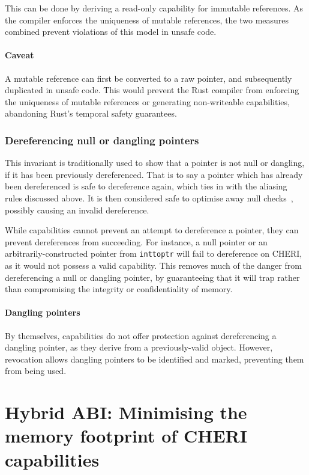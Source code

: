 \documentclass[dissertation.tex]{subfiles}
\begin{document}
This can be done by deriving a read-only capability for immutable
references.
As the compiler enforces the uniqueness of mutable references, the two
measures combined prevent violations of this model in unsafe code.

\paragraph{Caveat}
A mutable reference can first be converted to a raw pointer, and
subsequently duplicated in unsafe code.
This would prevent the Rust compiler from enforcing the uniqueness of
mutable references or generating non-writeable capabilities, abandoning
Rust's temporal safety guarantees.

\subsubsection{Dereferencing null or dangling pointers}
This invariant is traditionally used to show that a pointer is not
null or dangling, if it has been previously dereferenced.
That is to say a pointer which has already been dereferenced is safe to
dereference again, which ties in with the aliasing rules discussed
above.
It is then considered safe to optimise away null
checks~\cite{wang2013towards,llvm-undef-dce}, possibly causing an
invalid dereference.

While capabilities cannot prevent an attempt to dereference a pointer,
they can prevent dereferences from succeeding.
For instance, a null pointer or an arbitrarily-constructed pointer from
\texttt{inttoptr} will fail to dereference on CHERI, as it would not
possess a valid capability.
This removes much of the danger from dereferencing a null or dangling
pointer, by guaranteeing that it will trap rather than compromising the
integrity or confidentiality of memory.

\paragraph{Dangling pointers}
By themselves, capabilities do not offer protection against
dereferencing a dangling pointer, as they derive from a previously-valid
object.
However, revocation allows dangling pointers to be identified and
marked, preventing them from being used.


\section{Hybrid ABI: Minimising the memory footprint of CHERI capabilities}
\label{sec:eval-hybrid}
\end{document}
